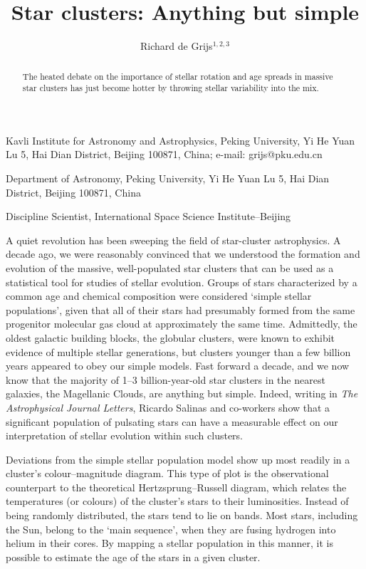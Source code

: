 \documentclass{natureprintstyle2}
\title{Star clusters: Anything but simple}
\author{Richard de Grijs$^{1,2,3}$}
\begin{document}
\maketitle

\begin{affiliations}
 \item Kavli Institute for Astronomy and Astrophysics, Peking
   University, Yi He Yuan Lu 5, Hai Dian District, Beijing 100871,
   China; e-mail: grijs@pku.edu.cn\\
 \item Department of Astronomy, Peking University, Yi He Yuan Lu 5,
   Hai Dian District, Beijing 100871, China\\
 \item Discipline Scientist, International Space Science
   Institute--Beijing\\
\end{affiliations}

\begin{abstract} 
The heated debate on the importance of stellar rotation and age
spreads in massive star clusters has just become hotter by throwing
stellar variability into the mix.
\end{abstract}

A quiet revolution has been sweeping the field of star-cluster
astrophysics. A decade ago, we were reasonably convinced that we
understood the formation and evolution of the massive, well-populated
star clusters that can be used as a statistical tool for studies of
stellar evolution. Groups of stars characterized by a common age and
chemical composition were considered `simple stellar populations',
given that all of their stars had presumably formed from the same
progenitor molecular gas cloud at approximately the same
time. Admittedly, the oldest galactic building blocks, the globular
clusters, were known to exhibit evidence of multiple stellar
generations\cite{ref1}, but clusters younger than a few billion years
appeared to obey our simple models. Fast forward a decade, and we now
know that the majority of 1--3 billion-year-old star clusters in the
nearest galaxies, the Magellanic Clouds, are anything but
simple. Indeed, writing in {\it The Astrophysical Journal Letters},
Ricardo Salinas and co-workers show that a significant population of
pulsating stars can have a measurable effect on our interpretation of
stellar evolution within such clusters\cite{ref2}.

Deviations from the simple stellar population model show up most
readily in a cluster's colour--magnitude diagram. This type of plot is
the observational counterpart to the theoretical Hertzsprung--Russell
diagram, which relates the temperatures (or colours) of the cluster's
stars to their luminosities. Instead of being randomly distributed,
the stars tend to lie on bands. Most stars, including the Sun, belong
to the `main sequence', when they are fusing hydrogen into helium in
their cores. By mapping a stellar population in this manner, it is
possible to estimate the age of the stars in a given
cluster.
\end{document}

